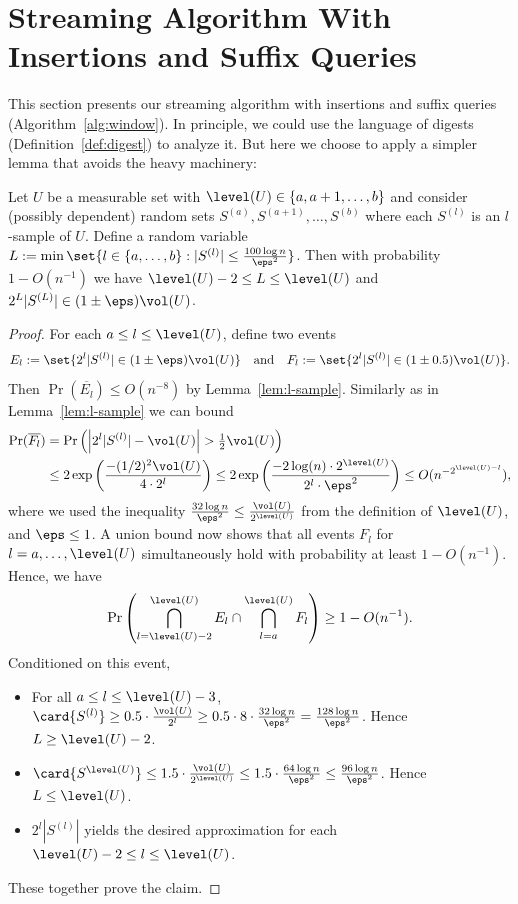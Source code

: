 \section{Streaming Algorithm With Insertions and Suffix Queries}
\label{sec:window}
%
This section presents our streaming algorithm with insertions and suffix queries (Algorithm~\ref{alg:window}).
In principle, we could use the language of digests (Definition~\ref{def:digest}) to analyze it. But here we choose to apply a simpler lemma that avoids the heavy machinery:
\begin{lemma}
    \label{lem:select-sample}
    Let $U$ be a measurable set with $\level(U) \in \{a,a+1,\ldots,b\}$ and consider (possibly dependent) random sets $S^{(a)}, S^{(a+1)}, \dots, S^{(b)}$ where each $S^{(l)}$ is an $l$-sample of $U$. Define a random variable $L := \min \set{l \in \{a,\ldots,b\} : |S^{(l)}| \leq \frac{100 \log n}{\eps^2}}$. Then with probability $1 - O(n^{-1})$ we have $\level(U)-2 \leq L \leq \level(U)$ and $2^L |S^{(L)}| \in (1 \pm \eps) \vol(U)$.
\end{lemma}
%
\begin{proof}
    For each $a \leq l \leq \level(U)$, define two events
    \[
        E_l := \set{2^l |S^{(l)}| \in (1 \pm \eps) \vol(U)} \quad\text{and}\quad
        F_l := \set{2^l |S^{(l)}| \in (1 \pm 0.5) \vol(U)}.
    \]
    Then $\Pr(\overline{E_l}) \leq O(n^{-8})$ by Lemma~\ref{lem:l-sample}. Similarly as in Lemma~\ref{lem:l-sample} we can bound 
    \begin{align*}
        \Pr(\overline{F_l})
        &= \Pr \left( \left| 2^l |S^{(l)}| - \vol(U) \right| > \tfrac 12 \vol(U) \right) \\
        &\leq 2\exp\left( \frac{-(1/2)^2 \vol(U)}{4 \cdot 2^l} \right)
        \leq 2\exp\left( \frac{-2 \log(n) \cdot 2^{\level(U)}}{2^l \cdot \eps^2} \right)
        \leq O(n^{-2^{\level(U)-l}}),
    \end{align*}
    where we used the inequality $\frac{32 \log n}{\eps^2} \leq \frac{\vol(U)}{2^{\level(U)}}$ from the definition of $\level(U)$, and $\eps \le 1$. A union bound now shows that all events $F_l$ for $l = a,\ldots,\level(U)$ simultaneously hold with probability at least $1 - O(n^{-1})$. Hence, we have
    \[
        \Pr\left( \bigcap_{l=\level(U)-2}^{\level(U)} E_l \cap \bigcap_{l=a}^{\level(U)} F_l \right)
        \geq 1 - O(n^{-1}).
    \]
    Conditioned on this event,
    \begin{itemize}
        \item For all $a \leq l \leq \level(U) - 3$, $\card{S^{(l)}} \geq 0.5 \cdot \frac{\vol(U)}{2^l} \geq 0.5 \cdot 8 \cdot \frac{32 \log n}{\eps^2} = \frac{128 \log n}{\eps^2}$. Hence $L \geq \level(U) - 2$.
        \item $\card{S^{\level(U)}} \leq 1.5 \cdot \frac{\vol(U)}{2^{\level(U)}} \leq 1.5 \cdot \frac{64 \log n}{\eps^2} \leq \frac{96 \log n}{\eps^2}$. Hence $L \leq \level(U)$.
        \item $2^l |S^{(l)}|$ yields the desired approximation for each $\level(U) - 2 \le l \le \level(U)$.
    \end{itemize}
    These together prove the claim.
\end{proof}
